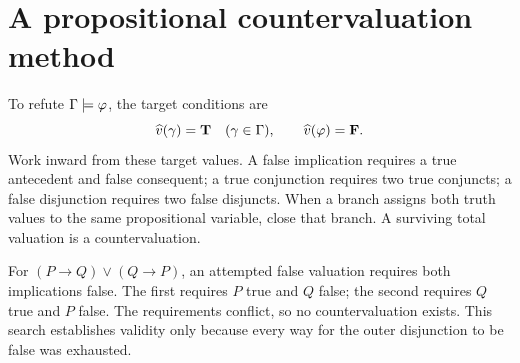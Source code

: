 \section{A propositional countervaluation method}
\label{sec:formal-practice-02}

To refute \(\Gamma\models\varphi\), the target conditions are
\[
  \widehat v(\gamma)=\mathbf{T}\quad(\gamma\in\Gamma),
  \qquad
  \widehat v(\varphi)=\mathbf{F}.
\]
Work inward from these target values.  A false implication requires a true
antecedent and false consequent; a true conjunction requires two true
conjuncts; a false disjunction requires two false disjuncts.  When a branch
assigns both truth values to the same propositional variable, close that branch.
A surviving total valuation is a countervaluation.

\begin{example}
For \((P\to Q)\lor(Q\to P)\), an attempted false valuation requires both
implications false.  The first requires \(P\) true and \(Q\) false; the second
requires \(Q\) true and \(P\) false.  The requirements conflict, so no
countervaluation exists.  This search establishes validity only because every
way for the outer disjunction to be false was exhausted.
\end{example}

